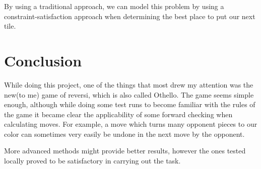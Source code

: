 \documentclass{article}
\begin{document}
By using a traditional approach, we can model this problem by using a constraint-satisfaction approach
	when determining the best place to put our next tile.
\section{Conclusion}
While doing this project, one of the things that most drew my attention was the new(to me) game of reversi,
	which is also called Othello.
The game seems simple enough, although while doing some test runs to become familiar with the rules of the
	game it became clear the applicability of some forward checking when calculating moves. 
For example, a move which turns many opponent pieces to our color can sometimes very easily be undone 
	in the next move by the opponent.

More advanced methods might provide better results, however the ones tested locally proved to be 
	satisfactory in carrying out the task.
\end{document}
